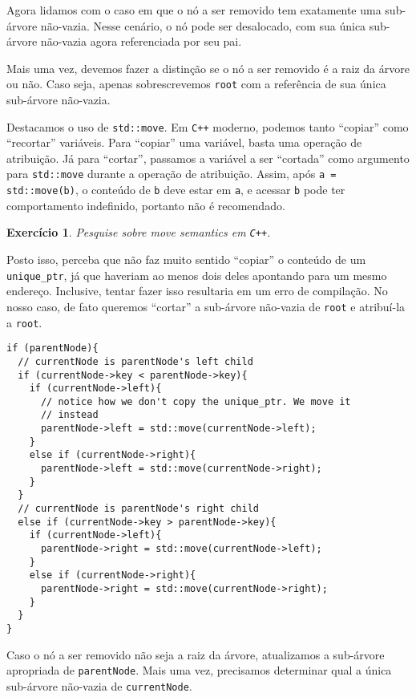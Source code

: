 \documentclass[11pt]{article}
\newtheorem{exercicio}{Exercício}
\begin{document}
Agora lidamos com o caso em que o nó a ser removido tem exatamente
uma sub-árvore não-vazia.  Nesse cenário, o nó pode ser
desalocado, com sua única sub-árvore não-vazia agora referenciada
por seu pai.

Mais uma vez, devemos fazer a distinção se o nó a ser removido é a
raiz da árvore ou não. Caso seja, apenas sobrescrevemos \texttt{root} com
a referência de sua única sub-árvore não-vazia.

Destacamos o uso de \texttt{std::move}.  Em \texttt{C++} moderno, podemos tanto
``copiar'' como ``recortar'' variáveis.  Para ``copiar'' uma
variável, basta uma operação de atribuição.  Já para ``cortar'',
passamos a variável a ser ``cortada'' como argumento para
\texttt{std::move} durante a operação de atribuição. Assim, após \texttt{a =
    std::move(b)}, o conteúdo de \texttt{b} deve estar em \texttt{a}, e acessar \texttt{b}
pode ter comportamento indefinido, portanto não é recomendado.

\begin{exercicio}
Pesquise sobre \emph{move semantics} em \texttt{C++}.
\end{exercicio}

Posto isso, perceba que não faz muito sentido ``copiar'' o
conteúdo de um \texttt{unique\_ptr}, já que haveriam ao menos dois deles
apontando para um mesmo endereço.  Inclusive, tentar fazer isso
resultaria em um erro de compilação.  No nosso caso, de fato
queremos ``cortar'' a sub-árvore não-vazia de \texttt{root} e atribuí-la
a \texttt{root}.

\begin{verbatim}
if (parentNode){
  // currentNode is parentNode's left child
  if (currentNode->key < parentNode->key){
    if (currentNode->left){
      // notice how we don't copy the unique_ptr. We move it
      // instead
      parentNode->left = std::move(currentNode->left);
    }
    else if (currentNode->right){
      parentNode->left = std::move(currentNode->right);
    }
  }
  // currentNode is parentNode's right child
  else if (currentNode->key > parentNode->key){
    if (currentNode->left){
      parentNode->right = std::move(currentNode->left);
    }
    else if (currentNode->right){
      parentNode->right = std::move(currentNode->right);
    }
  }
}
\end{verbatim}

Caso o nó a ser removido não seja a raiz da árvore, atualizamos a
sub-árvore apropriada de \texttt{parentNode}.  Mais uma vez, precisamos
determinar qual a única sub-árvore não-vazia de \texttt{currentNode}.
\end{document}
